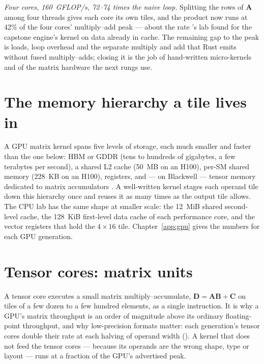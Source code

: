 \emph{Four cores, 160~GFLOP/s, 72--74 times the naive loop.} Splitting the rows of
$\mathbf{A}$ among four threads gives each core its own tiles, and the product
now runs at 42\% of the four cores' multiply--add peak --- about the rate
's lab found for the capstone engine's kernel on data already in
cache. The remaining gap to the peak is loads, loop overhead and the separate
multiply and add that Rust emits without fused multiply--adds; closing it is the
job of hand-written micro-kernels and of the matrix hardware the next rungs use.

\section{The memory hierarchy a tile lives in}

A GPU matrix kernel spans five levels of storage, each much smaller and faster
than the one below: HBM or GDDR (tens to hundreds of gigabytes, a few
terabytes per second), a shared L2 cache (50~MB on an H100), per-SM shared
memory (228~KB on an H100), registers, and --- on Blackwell --- tensor memory
dedicated to matrix accumulators \cite{nvidia2026hoppertuning,nvidia2026cutlassblackwell}.
A well-written kernel stages each operand tile down this hierarchy once and
reuses it as many times as the output tile allows. The CPU lab has the same
shape at smaller scale: the 12~MiB shared second-level cache, the 128~KiB
first-level data cache of each performance core, and the vector registers that
hold the $4 \times 16$ tile. Chapter~\ref{app:gpu} gives the numbers for each
GPU generation.


\section{Tensor cores: matrix units}

A tensor core executes a small matrix multiply--accumulate, $\mathbf{D}=
\mathbf{A}\mathbf{B}+\mathbf{C}$ on tiles of a few dozen to a few hundred
elements, as a single instruction. It is why a GPU's matrix throughput is an
order of magnitude above its ordinary floating-point throughput, and why
low-precision formats matter: each generation's tensor cores double their rate
at each halving of operand width (). A kernel that
does not feed the tensor cores --- because its operands are the wrong shape,
type or layout --- runs at a fraction of the GPU's advertised peak.


